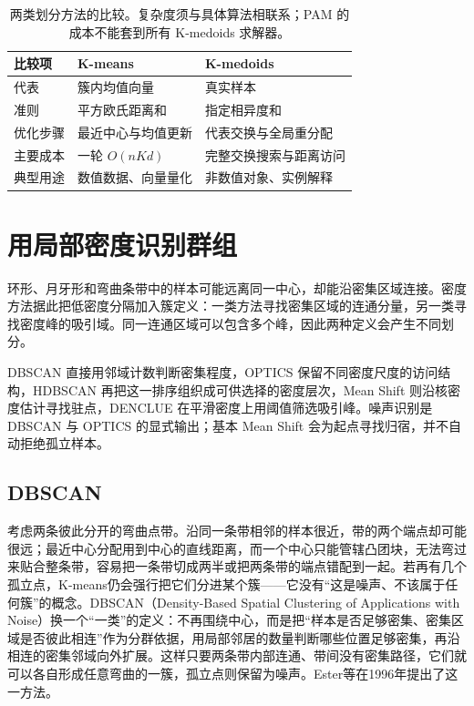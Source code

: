 \begin{table}[htbp]
 \small
 \begin{tabularx}{\linewidth}{@{}l>{\RaggedRight\arraybackslash}X>{\RaggedRight\arraybackslash}X@{}}
 \toprule
 比较项 & K-means & K-medoids\\
 \midrule
 代表 & 簇内均值向量 & 真实样本\\
 准则 & 平方欧氏距离和 & 指定相异度和\\
 优化步骤 & 最近中心与均值更新 & 代表交换与全局重分配\\
 主要成本 & 一轮 $O(nKd)$ & 完整交换搜索与距离访问\\
 典型用途 & 数值数据、向量量化 & 非数值对象、实例解释\\
 \bottomrule
 \end{tabularx}
 \caption{两类划分方法的比较。复杂度须与具体算法相联系；PAM 的成本不能套到所有 K-medoids 求解器。}
 \label{tab:clustering-partition}
\end{table}
\section{用局部密度识别群组}
\label{sec:clustering-density}

环形、月牙形和弯曲条带中的样本可能远离同一中心，却能沿密集区域连接。密度方法据此把低密度分隔加入簇定义：一类方法寻找密集区域的连通分量，另一类寻找密度峰的吸引域。同一连通区域可以包含多个峰，因此两种定义会产生不同划分。

DBSCAN 直接用邻域计数判断密集程度，OPTICS 保留不同密度尺度的访问结构，HDBSCAN 再把这一排序组织成可供选择的密度层次，Mean Shift 则沿核密度估计寻找驻点，DENCLUE 在平滑密度上用阈值筛选吸引峰。噪声识别是 DBSCAN 与 OPTICS 的显式输出；基本 Mean Shift 会为起点寻找归宿，并不自动拒绝孤立样本。
\subsection{DBSCAN}
\label{sec:clustering-dbscan}

考虑两条彼此分开的弯曲点带。沿同一条带相邻的样本很近，带的两个端点却可能很远；最近中心分配用到中心的直线距离，而一个中心只能管辖凸团块，无法弯过来贴合整条带，容易把一条带切成两半或把两条带的端点错配到一起。若再有几个孤立点，K-means仍会强行把它们分进某个簇——它没有“这是噪声、不该属于任何簇”的概念。DBSCAN（Density-Based Spatial Clustering of Applications with Noise）换一个“一类”的定义：不再围绕中心，而是把“样本是否足够密集、密集区域是否彼此相连”作为分群依据，用局部邻居的数量判断哪些位置足够密集，再沿相连的密集邻域向外扩展。这样只要两条带内部连通、带间没有密集路径，它们就可以各自形成任意弯曲的一簇，孤立点则保留为噪声。Ester等在1996年提出了这一方法。

